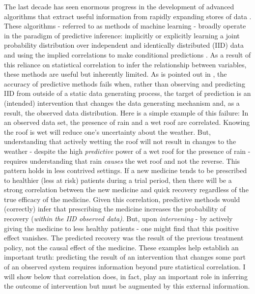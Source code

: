 \documentclass[../main.tex]{subfiles}
\begin{document}
    

The last decade has seen enormous progress in the development of advanced algorithms that extract useful information from rapidly expanding stores of data \parencite{Lecun2015DeepLearning}. These algorithms - referred to as methods of machine learning - broadly operate in the paradigm of predictive inference: implicitly or explicitly learning a joint probability distribution over independent and identically distributed (IID) data and using the implied correlations to make conditional predictions \parencite{Scholkopf2019CausalityLearning}. As a result of this reliance on statistical correlation to infer the relationship between variables, these methods are useful but inherently limited. As is pointed out in \textcite{Pearl2009CausalOverview}, the accuracy of predictive methods fails when, rather than observing and predicting IID from outside of a static data generating process, the target of prediction is an (intended) intervention that changes the data generating mechanism and, as a result, the observed data distribution. Here is a simple example of this failure: In an observed data set, the presence of rain and a wet roof are correlated. Knowing the roof is wet will reduce one’s uncertainty about the weather. But, understanding that actively wetting the roof will not result in changes to the weather - despite the high \textit{predictive} power of a wet roof for the presence of rain - requires understanding that rain \textit{causes} the wet roof and not the reverse. This pattern holds in less contrived settings. If a new medicine tends to be prescribed to healthier (less at risk) patients during a trial period, then there will be a strong correlation between the new medicine and quick recovery regardless of the true efficacy of the medicine. Given this correlation, predictive methods would (correctly) infer that prescribing the medicine increases the probability of recovery (\textit{within the IID observed data)}. But, upon \textit{intervening} - by actively giving the medicine to less healthy patients - one might find that this positive effect vanishes. The predicted recovery was the result of the previous treatment policy, not the causal effect of the medicine. These examples help establish an important truth: predicting the result of an intervention that changes some part of an observed system requires information beyond pure statistical correlation. I will show below that correlation does, in fact, play an important role in inferring the outcome of intervention but must be augmented by this external information.\par
\end{document}
